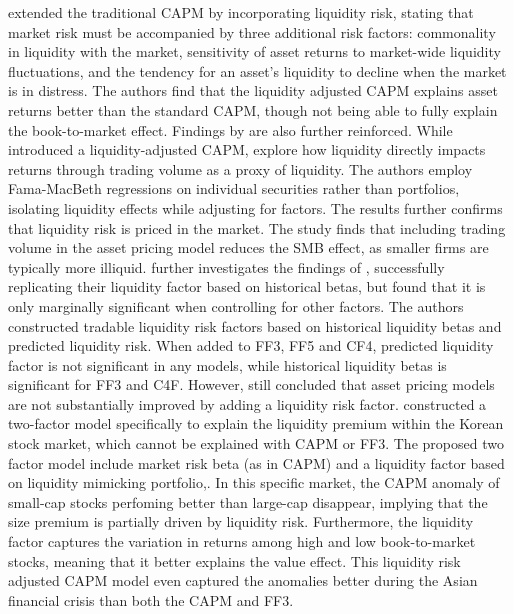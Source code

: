  extended the traditional CAPM by incorporating liquidity risk, stating that market risk must be accompanied by three additional risk factors: commonality in liquidity with the market, sensitivity of asset returns to market-wide liquidity fluctuations, and the tendency for an asset's liquidity to decline when the market is in distress. The authors find that the liquidity adjusted CAPM explains asset returns better than the standard CAPM, though not being able to fully explain the book-to-market effect. Findings by  are also further reinforced. While  introduced a liquidity-adjusted CAPM, explore how liquidity directly impacts returns through trading volume as a proxy of liquidity. The authors employ Fama-MacBeth regressions on individual securities rather than portfolios, isolating liquidity effects while adjusting for  factors. The results further confirms that liquidity risk is priced in the market. The study finds that including trading volume in the asset pricing model reduces the SMB effect, as smaller firms are typically more illiquid.  further investigates the findings of , successfully replicating their liquidity factor based on historical betas, but found that it is only marginally significant when controlling for other factors. The authors constructed tradable liquidity risk factors based on historical liquidity betas and predicted liquidity risk. When added to FF3, FF5 and CF4, predicted liquidity factor is not significant in any models, while historical liquidity betas is significant for FF3 and C4F. However,  still concluded that asset pricing models are not substantially improved by adding a liquidity risk factor.  constructed a two-factor model specifically to explain the liquidity premium within the Korean stock market, which cannot be explained with CAPM or FF3. The proposed two factor model include market risk beta (as in CAPM) and a liquidity factor based on liquidity mimicking portfolio,. In this specific market, the CAPM anomaly of small-cap stocks perfoming better than large-cap disappear, implying that the size premium is partially driven by liquidity risk. Furthermore, the liquidity factor captures the variation in returns among high and low book-to-market stocks, meaning that it better explains the value effect. This liquidity risk adjusted CAPM model even captured the anomalies better during the Asian financial crisis than both the CAPM and FF3.

